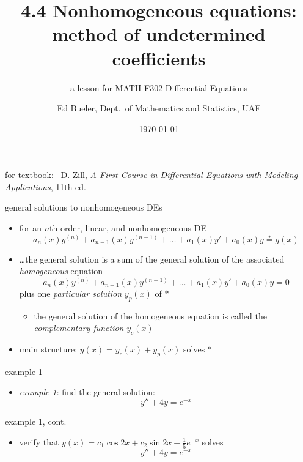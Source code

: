 \documentclass{beamer}
\title{4.4 Nonhomogeneous equations: \\ method of undetermined coefficients}
\subtitle{a lesson for MATH F302 Differential Equations}
\author{Ed Bueler, Dept.~of Mathematics and Statistics, UAF}
\date{\tiny \today}
\begin{document}


\begin{frame}
\titlepage

\centerline{\tiny for textbook: \, D. Zill, \emph{A First Course in Differential Equations with Modeling Applications}, 11th ed.}
\end{frame}


\begin{frame}{general solutions to nonhomogeneous DEs}

\begin{itemize}
\item for an $n$th-order, linear, and nonhomogeneous DE
\begin{equation*}
    a_n(x) y^{(n)} + a_{n-1}(x) y^{(n-1)} + \dots + a_1(x) y' + a_0(x) y \stackrel{\ast}{=} g(x)
\end{equation*}
\item \dots the general solution is a sum of the general solution of the associated \emph{homogeneous} equation
\begin{equation*}
    a_n(x) y^{(n)} + a_{n-1}(x) y^{(n-1)} + \dots + a_1(x) y' + a_0(x) y = 0
\end{equation*}
plus one \emph{particular solution} $y_p(x)$ of $\ast$
    \begin{itemize}
    \item the general solution of the homogeneous equation is called the \emph{complementary function} $y_c(x)$
    \end{itemize}

\bigskip
\item main structure: \alert{$y(x) = y_c(x) + y_p(x)$ solves $\ast$}
\end{itemize}
\end{frame}


\begin{frame}{example 1}

\begin{itemize}
\item \emph{example 1}: find the general solution:
    $$y'' + 4 y = e^{-x}$$
\end{itemize}

\vspace{60mm}
\end{frame}


\begin{frame}{example 1, cont.}

\begin{itemize}
\item verify that $y(x) = c_1 \cos 2x + c_2 \sin 2x + \frac{1}{5} e^{-x}$ solves
    $$y'' + 4 y = e^{-x}$$

\vspace{60mm}
\end{itemize}
\end{frame}
\end{document}

